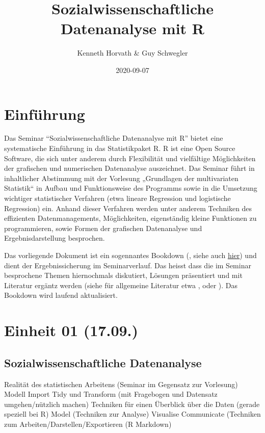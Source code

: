 \documentclass[
]{book}
\title{Sozialwissenschaftliche Datenanalyse mit R}
\author{Kenneth Horvath \& Guy Schwegler}
\date{2020-09-07}
\begin{document}
\maketitle

{
\setcounter{tocdepth}{1}
\tableofcontents
}
\hypertarget{einfuxfchrung}{%
\chapter*{Einführung}\label{einfuxfchrung}}

Das Seminar ``Sozialwissenschaftliche Datenanalyse mit R'' bietet eine systematische Einführung in das Statistikpaket R. R ist eine Open Source Software, die sich unter anderem durch Flexibilität und vielfältige Möglichkeiten der grafischen und numerischen Datenanalyse auszeichnet. Das Seminar führt in inhaltlicher Abstimmung mit der Vorlesung „Grundlagen der multivariaten Statistik`` in Aufbau und Funktionsweise des Programms sowie in die Umsetzung wichtiger statistischer Verfahren (etwa lineare Regression und logistische Regression) ein. Anhand dieser Verfahren werden unter anderem Techniken des effizienten Datenmanagements, Möglichkeiten, eigenständig kleine Funktionen zu programmieren, sowie Formen der grafischen Datenanalyse und Ergebnisdarstellung besprochen.

Das vorliegende Dokument ist ein sogennantes Bookdown (\citet{R-bookdown}, siehe auch \href{https://bookdown.org/}{hier}) und dient der Ergebnissicherung im Seminarverlauf. Das heisst dass die im Seminar besprochene Themen hiernochmals diskutiert, Lösungen präsentiert und mit Literatur ergäntz werden (siehe für allgemeine Literatur etwa \citet{DiazBone2019}, \citet{Kabacoff2015} oder \citet{Manderscheid2017}). Das Bookdown wird laufend aktualisiert.

\hypertarget{einheit-01-17.09.}{%
\chapter{Einheit 01 (17.09.)}\label{einheit-01-17.09.}}

\hypertarget{sozialwissenschaftliche-datenanalyse}{%
\section{Sozialwissenschaftliche Datenanalyse}\label{sozialwissenschaftliche-datenanalyse}}

Realität des statistischen Arbeitens (Seminar im Gegensatz zur Vorlesung)
Modell
Import
Tidy und Transform (mit Fragebogen und Datensatz umgehen/nützlich machen)
Techniken für einen Überblick über die Daten (gerade speziell bei R)
Model (Techniken zur Analyse)
Visualise
Communicate (Techniken zum Arbeiten/Darstellen/Exportieren (R Markdown)
\end{document}
